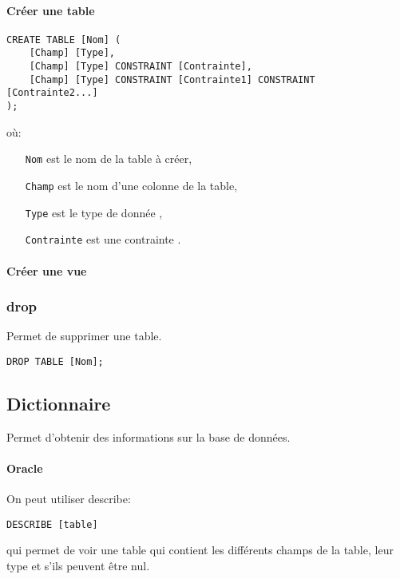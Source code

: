 \documentclass[10pt,a4paper,french]{article}
\begin{document}
\paragraph{Créer une table}\label{sec:table:create}
\begin{verbatim}
CREATE TABLE [Nom] (
    [Champ] [Type],
    [Champ] [Type] CONSTRAINT [Contrainte],
    [Champ] [Type] CONSTRAINT [Contrainte1] CONSTRAINT [Contrainte2...]
);
\end{verbatim}
où:
\begin{itemize}
\item[\tt Nom] est le nom de la table à créer,
\item[\tt Champ] est le nom d'une colonne de la table,
\item[\tt Type] est le type de donnée ,
\item[\tt Contrainte] est une contrainte .
\end{itemize}

\paragraph{Créer une vue}

\subsubsection{\gls{drop}}

Permet de supprimer une table.
\begin{verbatim}
DROP TABLE [Nom];
\end{verbatim}

\subsection{Dictionnaire}

Permet d'obtenir des informations sur la base de données.

\paragraph{Oracle} On peut utiliser \gls{describe}:
\begin{verbatim}
DESCRIBE [table]
\end{verbatim}
qui permet de voir une table qui contient les différents champs de la table, leur type et s'ils peuvent être nul.
\end{document}
